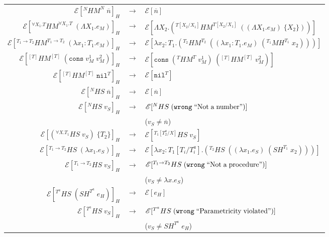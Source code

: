 \begin{figure}
\onehalfspacing
\begin{center}
\begin{tabular}{rcl}
$\mathscr{E}[^{N}HM^{N}\;\overline{n}]_{H}$ & $\rightarrow$ & $\mathscr{E}[\overline{n}]$ \\
$\mathscr{E}[^{\forall X_{1}.T}HM^{\forall X_{1}.T}\;(\Lambda X_{1}.e_{M})]_{H}$ & $\rightarrow$ & $\mathscr{E}[\Lambda X_{2}.(^{T[X_{2}/X_{1}]}HM^{T[X_{2}/X_{1}]}\;((\Lambda X_{1}.e_{M})\;\lbrace X_{2}\rbrace))]$ \\
$\mathscr{E}[^{T_{1}\rightarrow T_{2}}HM^{T_{1}\rightarrow T_{2}}\;(\lambda x_{1}:T_{1}.e_{M})]_{H}$ & $\rightarrow$ & $\mathscr{E}[\lambda x_{2}:T_{1}.(^{T_{2}}HM^{T_{2}}\;((\lambda x_{1}:T_{1}.e_{M})\;(^{T_{1}}MH^{T_{1}}\;x_{2})))]$ \\
$\mathscr{E}[^{[T]}HM^{[T]}\;(\mathtt{cons}\;v_{M}^{1}\;v_{M}^{2})]_{H}$ & $\rightarrow$ & $\mathscr{E}[\mathtt{cons}\;(^{T}HM^{T}\;v_{M}^{1})\;(^{[T]}HM^{[T]}\;v_{M}^{2})]$ \\
$\mathscr{E}[^{[T]}HM^{[T]}\;\mathtt{nil}^{T}]_{H}$ & $\rightarrow$ & $\mathscr{E}[\mathtt{nil}^{T}]$ \\
$\mathscr{E}[^{N}HS\;\overline{n}]_{H}$ & $\rightarrow$ & $\mathscr{E}[\overline{n}]$ \\
$\mathscr{E}[^{N}HS\;v_{S}]_{H}$ & $\rightarrow$ & $\mathscr{E}[^{N}HS\;(\mathtt{wrong}\;\mathrm{``Not\;a\;number"})]$ \\
&& ($v_{S}\neq\overline{n}$) \\
$\mathscr{E}[(^{\forall X.T_{1}}HS\;v_{S})\;\lbrace T_{2}\rbrace]_{H}$ & $\rightarrow$ & $\mathscr{E}[^{T_{1}[T^{a}_{2}/X]}HS\;v_{S}]$ \\
$\mathscr{E}[^{T_{1}\rightarrow T_{2}}HS\;(\lambda x_{1}.e_{S})]_{H}$ & $\rightarrow$ & $\mathscr{E}[\lambda x_{2}:T_{1}[T_{i}/T^{a}_{i}].(^{T_{2}}HS\;((\lambda x_{1}.e_{S})\;(SH^{T_{1}}\;x_{2})))]$ \\
$\mathscr{E}[^{T_{1}\rightarrow T_{2}}HS\;v_{S}]_{H}$ & $\rightarrow$ & $\mathscr{E}[^{T_{1}\rightarrow T_{2}}HS\;(\mathtt{wrong}\;\mathrm{``Not\;a\;procedure"})]$ \\
&& ($v_{S}\neq\lambda x.e_{S}$) \\
$\mathscr{E}[^{T^{a}}HS\;(SH^{T^{a}}\;e_{H})]_{H}$ & $\rightarrow$ & $\mathscr{E}[e_{H}]$ \\
$\mathscr{E}[^{T^{a}}HS\;v_{S}]_{H}$ & $\rightarrow$ & $\mathscr{E}[^{T^{a}}HS\;(\mathtt{wrong}\;\mathrm{``Parametricity\;violated"})]$ \\
&& ($v_{S}\neq SH^{T^{a}}\;e_{H}$) \\

\end{tabular}
\end{center}
\end{figure}
